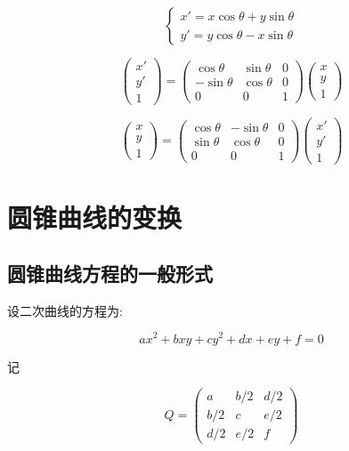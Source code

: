 \[
  \begin{cases}
    x' = x\cos\theta+y\sin\theta\\
    y' = y\cos\theta-x\sin\theta
  \end{cases}
\]

\[
  \begin{pmatrix}
    x'\\
    y'\\
    1
  \end{pmatrix}
  =
  \begin{pmatrix}
    \cos\theta & \sin\theta & 0\\
    -\sin\theta & \cos\theta & 0\\
    0 & 0 & 1
  \end{pmatrix}
  \begin{pmatrix}
    x\\
    y\\
    1
  \end{pmatrix}
\]

\[
  \begin{pmatrix}
    x\\
    y\\
    1
  \end{pmatrix}
  =
  \begin{pmatrix}
    \cos\theta & -\sin\theta & 0\\
    \sin\theta & \cos\theta & 0\\
    0 & 0 & 1
  \end{pmatrix}
  \begin{pmatrix}
    x'\\
    y'\\
    1
  \end{pmatrix}
\]

\section{圆锥曲线的变换}

\subsection{圆锥曲线方程的一般形式}

设二次曲线的方程为:

\[
  ax^2 + bxy + cy^2 + dx + ey + f = 0
\]

记

\[
  Q = \begin{pmatrix}
    a & b/2 & d/2\\
    b/2 & c & e/2\\
    d/2 & e/2 & f
  \end{pmatrix}
\]

